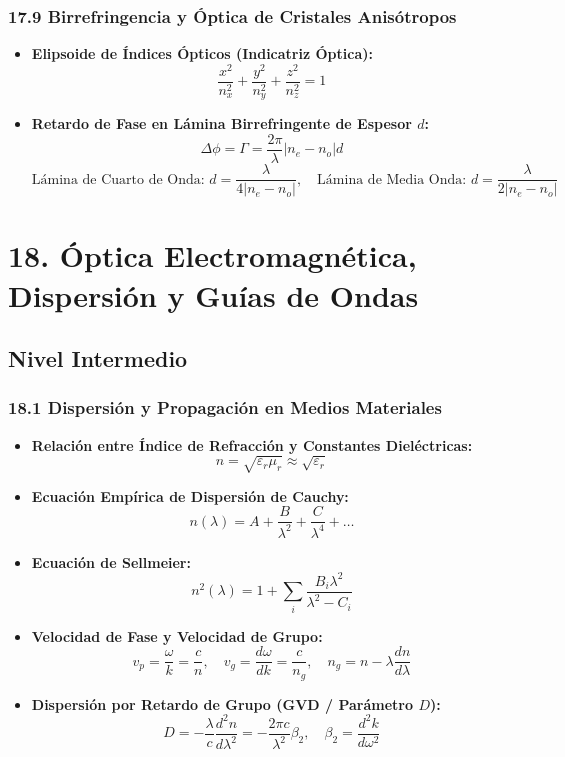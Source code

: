 \documentclass[11pt,a4paper]{article}
\begin{document}
\subsubsection*{17.9 Birrefringencia y Óptica de Cristales Anisótropos}

\begin{itemize}
  \item \textbf{Elipsoide de Índices Ópticos (Indicatriz Óptica):}
  \[
    \frac{x^2}{n_x^2} + \frac{y^2}{n_y^2} + \frac{z^2}{n_z^2} = 1
  \]
  \item \textbf{Retardo de Fase en Lámina Birrefringente de Espesor $d$:}
  \[
    \Delta\phi = \Gamma = \frac{2\pi}{\lambda} |n_e - n_o| d
  \]
  \[
    \text{Lámina de Cuarto de Onda: } d = \frac{\lambda}{4|n_e - n_o|}, \quad \text{Lámina de Media Onda: } d = \frac{\lambda}{2|n_e - n_o|}
  \]
\end{itemize}

\section*{18. Óptica Electromagnética, Dispersión y Guías de Ondas}

\subsection*{Nivel Intermedio}

\subsubsection*{18.1 Dispersión y Propagación en Medios Materiales}

\begin{itemize}
  \item \textbf{Relación entre Índice de Refracción y Constantes Dieléctricas:}
  \[
    n = \sqrt{\varepsilon_r \mu_r} \approx \sqrt{\varepsilon_r}
  \]
  \item \textbf{Ecuación Empírica de Dispersión de Cauchy:}
  \[
    n(\lambda) = A + \frac{B}{\lambda^2} + \frac{C}{\lambda^4} + \dots
  \]
  \item \textbf{Ecuación de Sellmeier:}
  \[
    n^2(\lambda) = 1 + \sum_{i} \frac{B_i \lambda^2}{\lambda^2 - C_i}
  \]
  \item \textbf{Velocidad de Fase y Velocidad de Grupo:}
  \[
    v_p = \frac{\omega}{k} = \frac{c}{n}, \quad v_g = \frac{d\omega}{dk} = \frac{c}{n_g}, \quad n_g = n - \lambda \frac{dn}{d\lambda}
  \]
  \item \textbf{Dispersión por Retardo de Grupo (GVD / Parámetro $D$):}
  \[
    D = -\frac{\lambda}{c} \frac{d^2 n}{d\lambda^2} = -\frac{2\pi c}{\lambda^2} \beta_2, \quad \beta_2 = \frac{d^2 k}{d\omega^2}
  \]
\end{itemize}
\end{document}
